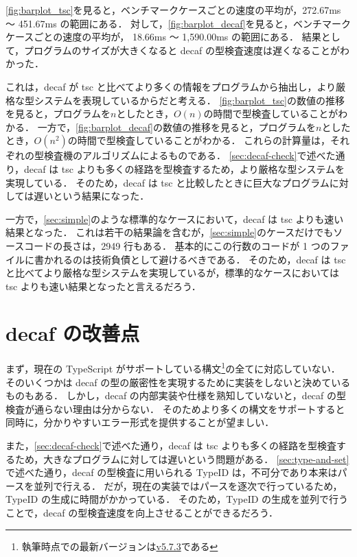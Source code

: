 \ref{fig:barplot_tsc}を見ると，ベンチマークケースごとの速度の平均が，272.67ms 〜 451.67ms の範囲にある．
対して，\ref{fig:barplot_decaf}を見ると，ベンチマークケースごとの速度の平均が， 18.66ms 〜 1,590.00ms の範囲にある．
結果として，プログラムのサイズが大きくなると decaf の型検査速度は遅くなることがわかった．

これは，decaf が tsc と比べてより多くの情報をプログラムから抽出し，より厳格な型システムを表現しているからだと考える．
\ref{fig:barplot_tsc}の数値の推移を見ると，プログラムを$n$としたとき，$O(n)$の時間で型検査していることがわかる．
一方で，\ref{fig:barplot_decaf}の数値の推移を見ると，プログラムを$n$としたとき，$O(n^2)$の時間で型検査していることがわかる．
これらの計算量は，それぞれの型検査機のアルゴリズムによるものである．
\ref{sec:decaf-check}で述べた通り，decaf は tsc よりも多くの経路を型検査するため，より厳格な型システムを実現している．
そのため，decaf は tsc と比較したときに巨大なプログラムに対しては遅いという結果になった．

一方で，\ref{sec:simple}のような標準的なケースにおいて，decaf は tsc よりも速い結果となった．
これは若干の結果論を含むが，\ref{sec:simple}のケースだけでもソースコードの長さは，2949 行もある．
基本的にこの行数のコードが 1 つのファイルに書かれるのは技術負債として避けるべきである．
そのため，decaf は tsc と比べてより厳格な型システムを実現しているが，標準的なケースにおいては tsc よりも速い結果となったと言えるだろう．

\section{decaf の改善点}

まず，現在の TypeScript がサポートしている構文\footnote{執筆時点での最新バージョンは\href{https://github.com/microsoft/TypeScript/tree/v5.7.3}{v5.7.3}である}の全てに対応していない．
そのいくつかは decaf の型の厳密性を実現するために実装をしないと決めているものもある．
しかし，decaf の内部実装や仕様を熟知していないと，decaf の型検査が通らない理由は分からない．
そのためより多くの構文をサポートすると同時に，分かりやすいエラー形式を提供することが望ましい．

また，\ref{sec:decaf-check}で述べた通り，decaf は tsc よりも多くの経路を型検査するため，大きなプログラムに対しては遅いという問題がある．
\ref{sec:type-and-set}で述べた通り，decaf の型検査に用いられる TypeID は，不可分であり本来はパースを並列で行える．
だが，現在の実装ではパースを逐次で行っているため，TypeID の生成に時間がかかっている．
そのため，TypeID の生成を並列で行うことで，decaf の型検査速度を向上させることができるだろう．
